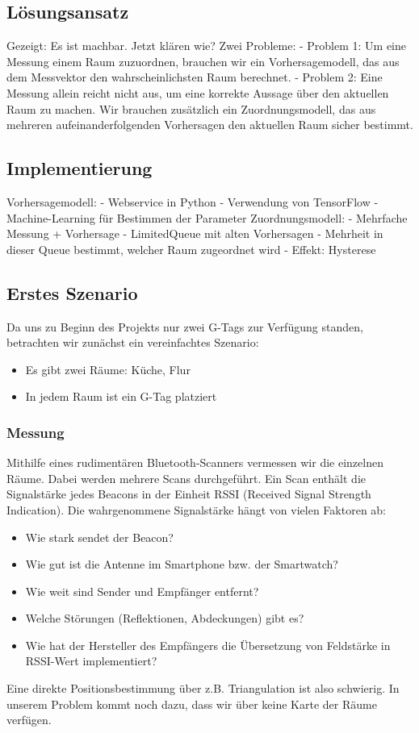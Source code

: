 \subsection{Lösungsansatz}

Gezeigt: Es ist machbar. Jetzt klären wie?
Zwei Probleme:
- Problem 1: Um eine Messung einem Raum zuzuordnen, brauchen wir ein Vorhersagemodell,
  das aus dem Messvektor den wahrscheinlichsten Raum berechnet.
- Problem 2: Eine Messung allein reicht nicht aus, um eine korrekte Aussage über
  den aktuellen Raum zu machen. Wir brauchen zusätzlich ein Zuordnungsmodell,
  das aus mehreren aufeinanderfolgenden Vorhersagen den aktuellen Raum sicher
  bestimmt.
  
\subsection{Implementierung}

Vorhersagemodell:
- Webservice in Python
- Verwendung von TensorFlow
- Machine-Learning für Bestimmen der Parameter
Zuordnungsmodell:
- Mehrfache Messung + Vorhersage
- LimitedQueue mit alten Vorhersagen
- Mehrheit in dieser Queue bestimmt, welcher Raum zugeordnet wird
- Effekt: Hysterese

\subsection{Erstes Szenario}

Da uns zu Beginn des Projekts nur zwei G-Tags zur Verfügung standen, betrachten
wir zunächst ein vereinfachtes Szenario:
\begin{itemize}
	\item Es gibt zwei Räume: Küche, Flur
	\item In jedem Raum ist ein G-Tag platziert
\end{itemize}

\subsubsection{Messung}

Mithilfe eines rudimentären Bluetooth-Scanners vermessen wir die einzelnen Räume.
Dabei werden mehrere Scans durchgeführt. Ein Scan enthält die Signalstärke 
jedes Beacons in der Einheit RSSI (Received Signal Strength Indication).
Die wahrgenommene Signalstärke hängt von vielen Faktoren ab:
\begin{itemize}
	\item Wie stark sendet der Beacon?
	\item Wie gut ist die Antenne im Smartphone bzw. der Smartwatch?
	\item Wie weit sind Sender und Empfänger entfernt?
	\item Welche Störungen (Reflektionen, Abdeckungen) gibt es?
	\item Wie hat der Hersteller des Empfängers die Übersetzung von Feldstärke in RSSI-Wert implementiert?
\end{itemize}
Eine direkte Positionsbestimmung über z.B. Triangulation ist also schwierig.
In unserem Problem kommt noch dazu, dass wir über keine Karte der Räume
verfügen.

